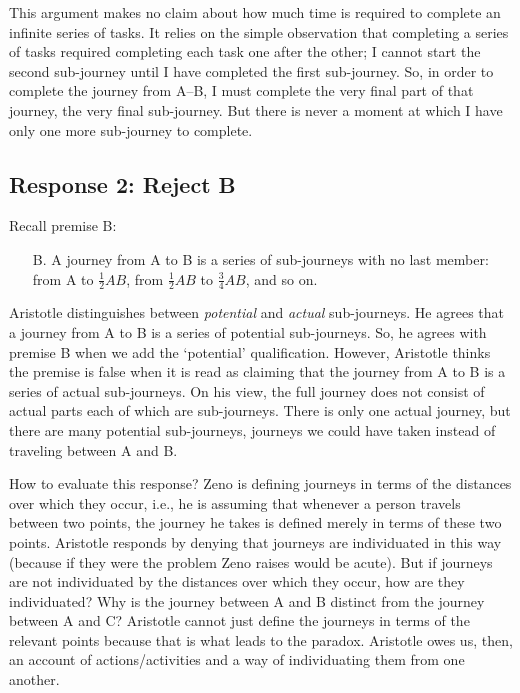 \documentclass[oneside]{article}
\begin{document}
This argument makes no claim about how much time is required to complete an infinite series of tasks. It relies on the simple observation that completing a series of tasks required completing each task one after the other; I cannot start the second sub-journey until I have completed the first sub-journey. So, in order to complete the journey from A--B, I must complete the very final part of that journey, the very final sub-journey. But there is never a moment at which I have only one more sub-journey to complete. 

\subsection*{Response 2: Reject B}

Recall premise B: 
\begin{enumerate}
\item[B.]  A journey from A to B is a series of sub-journeys with no last member:
  from A to \(\frac{1}{2}AB\), from \(\frac{1}{2}AB\) to
  \(\frac{3}{4}AB\), and so on.
  \end{enumerate}
Aristotle distinguishes between \emph{potential} and \emph{actual} sub-journeys. He agrees that a journey from A to B is a series of potential sub-journeys. So, he agrees with premise B when we add the `potential' qualification. However, Aristotle thinks the premise is false when it is read as claiming that the journey from A to B is a series of actual sub-journeys. On his view, the full journey does not consist of actual parts each of which are sub-journeys. There is only one actual journey, but there are many potential sub-journeys, journeys we could have taken instead of traveling between A and  B. 

How to evaluate this response? Zeno is defining journeys in terms of the distances over which they occur, i.e., he is assuming that whenever a person travels between two points, the journey he takes is defined merely in terms of these two points. Aristotle responds by denying that journeys are individuated in this way (because if they were the problem Zeno raises would be acute). But if journeys are not individuated by the distances over which they occur, how are they individuated? Why is the journey between A and B distinct from the journey between A and C? Aristotle cannot just define the journeys in terms of the relevant points because that is what leads to the paradox. Aristotle owes us, then, an account of actions/activities and a way of individuating them from one another. 
\end{document}
